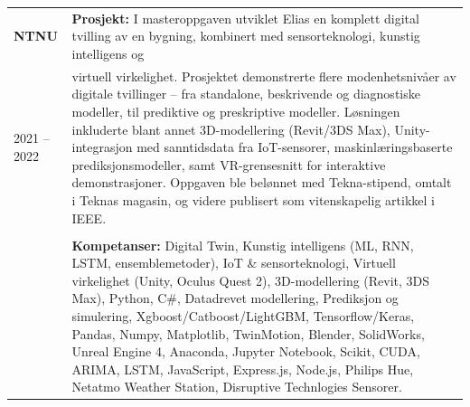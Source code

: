 \documentclass[a4paper,10pt]{article}
\begin{document}
\noindent
\begin{longtable}{@{}p{4cm}p{11cm}@{}}  %
\textbf{NTNU} 
& \textbf{Prosjekt:} I masteroppgaven utviklet Elias en komplett digital tvilling av en bygning, kombinert med sensorteknologi, kunstig intelligens og \\
2021 -- 2022  & virtuell virkelighet. Prosjektet demonstrerte flere modenhetsnivåer av digitale tvillinger – fra standalone, beskrivende og diagnostiske modeller, til prediktive og preskriptive modeller. Løsningen inkluderte blant annet 3D-modellering (Revit/3DS Max), Unity-integrasjon med sanntidsdata fra IoT-sensorer, maskinlæringsbaserte prediksjonsmodeller, samt VR-grensesnitt for interaktive demonstrasjoner. Oppgaven ble belønnet med Tekna-stipend, omtalt i Teknas magasin, og videre publisert som vitenskapelig artikkel i IEEE. \\
& \\
& \textbf{Kompetanser:} Digital Twin, Kunstig intelligens (ML, RNN, LSTM, ensemblemetoder), IoT \& sensorteknologi, Virtuell virkelighet (Unity, Oculus Quest 2), 3D-modellering (Revit, 3DS Max), Python, C\#, Datadrevet modellering, Prediksjon og simulering, Xgboost/Catboost/LightGBM, Tensorflow/Keras, Pandas, Numpy, Matplotlib, TwinMotion, Blender, SolidWorks, Unreal Engine 4, Anaconda, Jupyter Notebook, Scikit, CUDA, ARIMA, LSTM, JavaScript, Express.js, Node.js, Philips Hue, Netatmo Weather Station, Disruptive Technlogies Sensorer. \\
\end{longtable}
 


 
\end{document}
